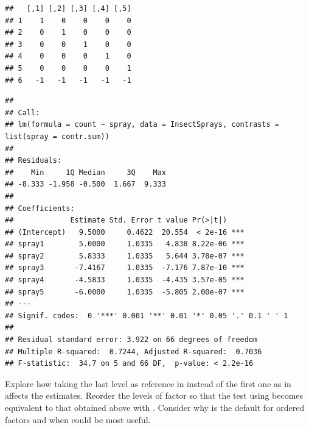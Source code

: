 \documentclass[krantz2]{krantz}\usepackage{knitr}
\begin{document}
\begin{knitrout}\footnotesize
{}\color{fgcolor}\begin{kframe}
\begin{alltt}
\hlstd{(}\hlstd{(}\hlopt{$}
\end{alltt}
\begin{verbatim}
##   [,1] [,2] [,3] [,4] [,5]
## 1    1    0    0    0    0
## 2    0    1    0    0    0
## 3    0    0    1    0    0
## 4    0    0    0    1    0
## 5    0    0    0    0    1
## 6   -1   -1   -1   -1   -1
\end{verbatim}
\end{kframe}
\end{knitrout}

\begin{knitrout}\footnotesize
{}\color{fgcolor}\begin{kframe}
\begin{alltt}
\end{alltt}
\begin{verbatim}
## 
## Call:
## lm(formula = count ~ spray, data = InsectSprays, contrasts = list(spray = contr.sum))
## 
## Residuals:
##    Min     1Q Median     3Q    Max 
## -8.333 -1.958 -0.500  1.667  9.333 
## 
## Coefficients:
##             Estimate Std. Error t value Pr(>|t|)    
## (Intercept)   9.5000     0.4622  20.554  < 2e-16 ***
## spray1        5.0000     1.0335   4.838 8.22e-06 ***
## spray2        5.8333     1.0335   5.644 3.78e-07 ***
## spray3       -7.4167     1.0335  -7.176 7.87e-10 ***
## spray4       -4.5833     1.0335  -4.435 3.57e-05 ***
## spray5       -6.0000     1.0335  -5.805 2.00e-07 ***
## ---
## Signif. codes:  0 '***' 0.001 '**' 0.01 '*' 0.05 '.' 0.1 ' ' 1
## 
## Residual standard error: 3.922 on 66 degrees of freedom
## Multiple R-squared:  0.7244,	Adjusted R-squared:  0.7036 
## F-statistic:  34.7 on 5 and 66 DF,  p-value: < 2.2e-16
\end{verbatim}
\end{kframe}
\end{knitrout}

\begin{advplayground}
  Explore how taking the last level as reference in  instead of the first one as in  affects the estimates. Reorder the levels of factor  so that the test using  becomes equivalent to that obtained above with . Consider why  is the default for ordered factors and when  could be  most useful.
\end{advplayground}
\end{document}
